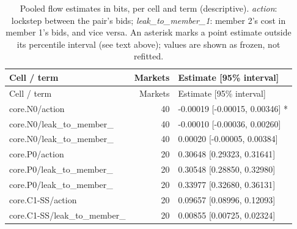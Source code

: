 \begingroup\footnotesize\setlength{\tabcolsep}{3pt}
\begin{longtable}{@{}p{2.6in}rl@{}}
\caption{Pooled flow estimates in bits, per cell and term (descriptive). \emph{action}: lockstep between the pair's bids; \emph{leak\_to\_member\_1}: member 2's cost in member 1's bids, and vice versa. An asterisk marks a point estimate outside its percentile interval (see text above); values are shown as frozen, not refitted.}\\
\toprule Cell / term & Markets & Estimate [95\% interval]\\\midrule\endfirsthead
\toprule Cell / term & Markets & Estimate [95\% interval]\\\midrule\endhead
\bottomrule\endfoot
core.\allowbreak N0/\allowbreak action & 40 & -0.00019 [-0.00015, 0.00346] *\\
core.\allowbreak N0/\allowbreak leak\_\allowbreak to\_\allowbreak member\_\allowbreak 1 & 40 & -0.00010 [-0.00036, 0.00260]\\
core.\allowbreak N0/\allowbreak leak\_\allowbreak to\_\allowbreak member\_\allowbreak 2 & 40 & 0.00020 [-0.00005, 0.00384]\\
core.\allowbreak P0/\allowbreak action & 20 & 0.30648 [0.29323, 0.31641]\\
core.\allowbreak P0/\allowbreak leak\_\allowbreak to\_\allowbreak member\_\allowbreak 1 & 20 & 0.30548 [0.28850, 0.32980]\\
core.\allowbreak P0/\allowbreak leak\_\allowbreak to\_\allowbreak member\_\allowbreak 2 & 20 & 0.33977 [0.32680, 0.36131]\\
core.\allowbreak C1-SS/\allowbreak action & 20 & 0.09657 [0.08996, 0.12093]\\
core.\allowbreak C1-SS/\allowbreak leak\_\allowbreak to\_\allowbreak member\_\allowbreak 1 & 20 & 0.00855 [0.00725, 0.02324]\\

\end{longtable}
